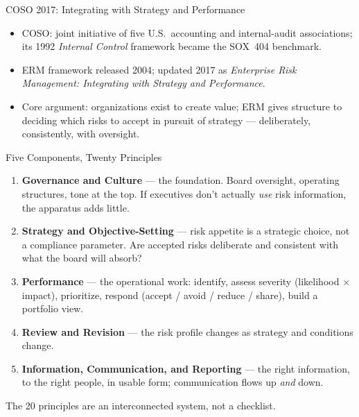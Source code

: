 \documentclass[11pt, aspectratio=169]{beamer}
\begin{document}
\begin{frame}{COSO 2017: Integrating with Strategy and Performance}
\begin{itemize}
  \item COSO: joint initiative of five U.S.\ accounting and internal-audit associations; its 1992 \emph{Internal Control} framework became the SOX~404 benchmark.
  \item ERM framework released 2004; updated 2017 as \emph{Enterprise Risk Management: Integrating with Strategy and Performance}.
  \item Core argument: organizations exist to \alert{create value}; ERM gives structure to deciding which risks to accept in pursuit of strategy --- deliberately, consistently, with oversight.
\end{itemize}
\end{frame}

\begin{frame}{Five Components, Twenty Principles}
\begin{enumerate}
  \item \textbf{Governance and Culture} --- the foundation. Board oversight, operating structures, tone at the top. If executives don't actually \emph{use} risk information, the apparatus adds little.
  \item \textbf{Strategy and Objective-Setting} --- \alert{risk appetite} is a strategic choice, not a compliance parameter. Are accepted risks deliberate and consistent with what the board will absorb?
  \item \textbf{Performance} --- the operational work: identify, assess severity (likelihood $\times$ impact), prioritize, respond (accept / avoid / reduce / share), build a \alert{portfolio view}.
  \item \textbf{Review and Revision} --- the risk profile changes as strategy and conditions change.
  \item \textbf{Information, Communication, and Reporting} --- the right information, to the right people, in usable form; communication flows up \emph{and} down.
\end{enumerate}
\medskip
The 20 principles are an interconnected system, not a checklist.
\end{frame}
\end{document}
